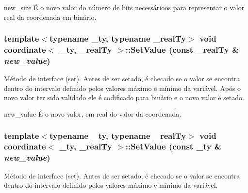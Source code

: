 new\_\-size É o novo valor do número de bits necessárioos para representar o valor real da coordenada em binário. \hypertarget{classcoordinate_a84cb188432f5139c669b8fd3fc0037f5}{
\subsubsection[{SetValue}]{\setlength{\rightskip}{0pt plus 5cm}template$<$typename \_\-ty, typename \_\-realTy$>$ void {\bf coordinate}$<$ \_\-ty, \_\-realTy $>$::SetValue (const \_\-realTy \& {\em new\_\-value})}}
\label{classcoordinate_a84cb188432f5139c669b8fd3fc0037f5}
Método de interface (set). Antes de ser setado, é checado se o valor se encontra dentro do intervalo definido pelos valores máximo e mínimo da variável. Após o novo valor ter sido validado ele é codificado para binário e o novo valor é setado.

new\_\-value É o novo valor, em real do valor da coordenada. \hypertarget{classcoordinate_ae66e44d1146ca8020809efe799a5a59c}{
\subsubsection[{SetValue}]{\setlength{\rightskip}{0pt plus 5cm}template$<$typename \_\-ty, typename \_\-realTy$>$ void {\bf coordinate}$<$ \_\-ty, \_\-realTy $>$::SetValue (const \_\-ty \& {\em new\_\-value})}}
\label{classcoordinate_ae66e44d1146ca8020809efe799a5a59c}
Método de interface (set). Antes de ser setado, é checado se o valor se encontra dentro do intervalo definido pelos valores máximo e mínimo da variável.

